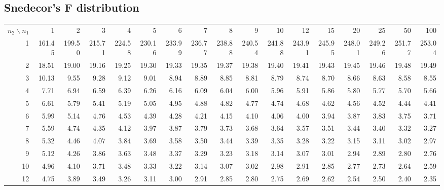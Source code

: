 \begin{landscape}
\section{Snedecor's F distribution}
\label{SnedecorTable}
\tiny

\begin{tabular}{|*{17}{r|}}
\hline  \rowcolor{lightturquoise} \multicolumn{17}{|c|}{95--Percentile of  Snedecor's  F--distribution
} \\
  \hline$n_2\backslash n_1$ &  1 & 2 & 3 & 4 & 5 & 6 & 7 & 8 & 9 & 10 & 12 & 15 & 20 & 25
  & 50 & 100 \\ 
\hline  1 & 161.45 & 199.50 & 215.71 & 224.58 & 230.16 & 233.99 & 236.77 & 238.88 & 240.54 & 241.88 & 243.91 & 245.95 & 248.01 & 249.26 & 251.77 & 253.04 \\ 
\hline  2 & 18.51 & 19.00 & 19.16 & 19.25 & 19.30 & 19.33 & 19.35 & 19.37 & 19.38 & 19.40 & 19.41 & 19.43 & 19.45 & 19.46 & 19.48 & 19.49 \\ 
\hline  3 & 10.13 &  9.55 &  9.28 &  9.12 &  9.01 &  8.94 &  8.89 &  8.85 &  8.81 &  8.79 &  8.74 &  8.70 &  8.66 &  8.63 &  8.58 &  8.55 \\ 
\hline  4 & 7.71 & 6.94 & 6.59 & 6.39 & 6.26 & 6.16 & 6.09 & 6.04 & 6.00 & 5.96 & 5.91 & 5.86 & 5.80 & 5.77 & 5.70 & 5.66 \\ 
\hline  5 & 6.61 & 5.79 & 5.41 & 5.19 & 5.05 & 4.95 & 4.88 & 4.82 & 4.77 & 4.74 & 4.68 & 4.62 & 4.56 & 4.52 & 4.44 & 4.41 \\ 
\hline  6 & 5.99 & 5.14 & 4.76 & 4.53 & 4.39 & 4.28 & 4.21 & 4.15 & 4.10 & 4.06 & 4.00 & 3.94 & 3.87 & 3.83 & 3.75 & 3.71 \\ 
\hline  7 & 5.59 & 4.74 & 4.35 & 4.12 & 3.97 & 3.87 & 3.79 & 3.73 & 3.68 & 3.64 & 3.57 & 3.51 & 3.44 & 3.40 & 3.32 & 3.27 \\ 
\hline  8 & 5.32 & 4.46 & 4.07 & 3.84 & 3.69 & 3.58 & 3.50 & 3.44 & 3.39 & 3.35 & 3.28 & 3.22 & 3.15 & 3.11 & 3.02 & 2.97 \\ 
\hline  9 & 5.12 & 4.26 & 3.86 & 3.63 & 3.48 & 3.37 & 3.29 & 3.23 & 3.18 & 3.14 & 3.07 & 3.01 & 2.94 & 2.89 & 2.80 & 2.76 \\ 
\hline  10 & 4.96 & 4.10 & 3.71 & 3.48 & 3.33 & 3.22 & 3.14 & 3.07 & 3.02 & 2.98 & 2.91 & 2.85 & 2.77 & 2.73 & 2.64 & 2.59 \\ 
\hline  12 & 4.75 & 3.89 & 3.49 & 3.26 & 3.11 & 3.00 & 2.91 & 2.85 & 2.80 & 2.75 & 2.69 & 2.62 & 2.54 & 2.50 & 2.40 & 2.35 \\ 

\end{tabular}
\end{landscape}
